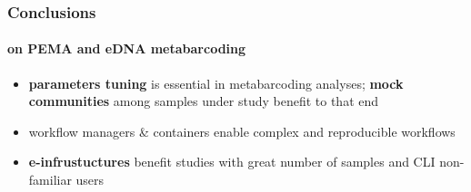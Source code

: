 \documentclass{beamer}
\begin{document}
\begin{frame}
\begin{singlespace}
\begin{textblock*}{5cm}
         \end{textblock*}

      \end{singlespace}

   \end{frame}

   
   
   \begin{frame}
      \frametitle{Conclusions}
      \framesubtitle{on PEMA and eDNA metabarcoding}

      \begin{itemize}
         \item \textbf{parameters tuning} is essential in metabarcoding analyses;
               \textbf{mock communities} among samples under study benefit to that end
         \item workflow managers \& containers enable complex and reproducible workflows 
         \item \textbf{e-infrustuctures} benefit studies with great number of samples and CLI non-familiar users
      \end{itemize}


   \end{frame}
\end{document}
